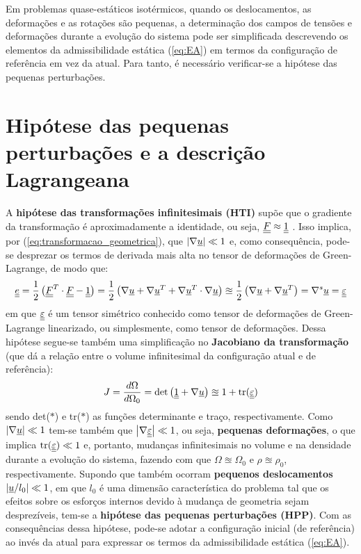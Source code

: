 Em problemas quase-estáticos isotérmicos, quando os deslocamentos, as deformações e as rotações são pequenas, a determinação dos campos de tensões e deformações durante a evolução do sistema pode ser simplificada descrevendo os elementos da admissibilidade estática (\ref{eq:EA}) em termos da configuração de referência em vez da atual. Para tanto, é necessário verificar-se a hipótese das pequenas perturbações.

\section{Hipótese das pequenas perturbações e a descrição Lagrangeana}

A \textbf{hipótese das transformações infinitesimais (HTI)} supõe que o gradiente da transformação é aproximadamente a identidade, ou seja, $\underline{\underline F} \approx \underline{\underline 1}$ . Isso implica, por (\ref{eq:transformacao_geometrica}), que $\left| \nabla \underline u \right| \ll 1$ e, como consequência, pode-se desprezar os termos de derivada mais alta no tensor de deformações de Green-Lagrange, de modo que:
\begin{equation}
	\label{eq:green_lagrange_linearizado}
	\underline{\underline e} = \frac{1}{2} \left(\underline{\underline F}^T \cdot \underline{\underline F} - \underline{\underline 1} \right) = \frac{1}{2} \left(\nabla \underline u + \nabla\underline u^T + \nabla\underline u^T \cdot \nabla \underline u \right) \approxeq \frac{1}{2} \left(\nabla \underline u + \nabla\underline u^T \right) = \nabla^s\underline u = \underline{\underline \varepsilon}
\end{equation}
em que $\underline{\underline \varepsilon}$ é um tensor simétrico conhecido como tensor de deformações de Green-Lagrange linearizado, ou simplesmente, como tensor de deformações. Dessa hipótese segue-se também uma simplificação no \textbf{Jacobiano da transformação} (que dá a relação entre o volume infinitesimal da configuração atual e de referência):
\begin{equation}
	\label{eq:jacobiano}
	J = \frac{d\Omega}{d\Omega_0} = \text{det}\left(\underline{\underline 1} + \nabla \underline u \right) \approxeq 1 + \text{tr}(\underline{\underline \varepsilon})
\end{equation}
sendo det($*$) e tr($*$) as funções determinante e traço, respectivamente. Como  $\left| \nabla \underline u \right| \ll 1$ tem-se também que $\left| \nabla \underline{\underline \varepsilon} \right| \ll 1$, ou seja, \textbf{pequenas deformações}, o que implica $\text{tr}(\underline{\underline \varepsilon}) \ll 1$ e, portanto, mudanças infinitesimais no volume e na densidade durante a evolução do sistema, fazendo com que $\Omega \approxeq \Omega_0$ e $\rho \approxeq \rho_0$, respectivamente. Supondo que também ocorram \textbf{pequenos deslocamentos} $\left| \underline u / l_0 \right| \ll 1$, em que $l_0$ é uma dimensão característica do problema tal que os efeitos sobre os esforços internos devido à mudança de geometria sejam desprezíveis, tem-se a \textbf{hipótese das pequenas perturbações (HPP)}. Com as consequências dessa hipótese, pode-se adotar a configuração inicial (de referência) ao invés da atual para expressar os termos da admissibilidade estática  (\ref{eq:EA}).

